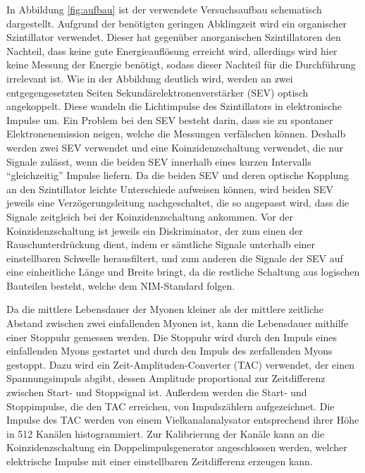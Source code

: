In Abbildung \ref{fig:aufbau} ist der verwendete Versuchsaufbau schematisch dargestellt. Aufgrund der benötigten geringen Abklingzeit wird ein organischer Szintillator
verwendet. Dieser hat gegenüber anorganischen Szintillatoren den Nachteil, dass keine gute Energieauflösung erreicht wird, allerdings wird hier keine Messung der
Energie benötigt, sodass dieser Nachteil für die Durchführung irrelevant ist.
Wie in der Abbildung deutlich wird, werden an zwei entgegengesetzten Seiten Sekundärelektronenverstärker (SEV) optisch angekoppelt. Diese wandeln die Lichtimpulse
des Szintillators in elektronische Impulse um. Ein Problem bei den SEV besteht darin, dass sie zu spontaner Elektronenemission neigen, welche die Messungen
verfälschen können. Deshalb werden zwei SEV verwendet und eine Koinzidenzschaltung verwendet, die nur Signale zulässt, wenn die beiden SEV innerhalb eines kurzen Intervalls \enquote{gleichzeitig}
Impulse liefern. Da die beiden SEV und deren optische Kopplung an den Szintillator leichte Unterschiede aufweisen können, wird beiden SEV jeweils eine Verzögerungsleitung nachgeschaltet, die
so angepasst wird, dass die Signale zeitgleich bei der Koinzidenzschaltung ankommen. Vor der Koinzidenzschaltung ist jeweils ein Diskriminator, der zum einen der Rauschunterdrückung dient,
indem er sämtliche Signale unterhalb einer einstellbaren Schwelle herausfiltert,
und zum anderen die Signale der SEV auf eine einheitliche Länge und Breite bringt, da die restliche Schaltung aus logischen Bauteilen besteht, welche dem NIM-Standard folgen.

Da die mittlere Lebensdauer der Myonen kleiner als der mittlere zeitliche Abstand zwischen zwei einfallenden Myonen ist, kann die Lebensdauer mithilfe einer Stoppuhr gemessen werden.
Die Stoppuhr wird durch den Impuls eines einfallenden Myons gestartet und durch den Impuls des zerfallenden Myons gestoppt. Dazu wird ein Zeit-Amplituden-Converter (TAC) verwendet,
der einen Spannungsimpuls abgibt, dessen Amplitude proportional
zur Zeitdifferenz zwischen Start- und Stoppsignal ist. Außerdem werden die Start- und Stoppimpulse, die den TAC erreichen, von Impulszählern aufgezeichnet. Die Impulse des TAC werden von einem
Vielkanalanalysator entsprechend ihrer Höhe in 512 Kanälen histogrammiert. Zur Kalibrierung der Kanäle kann an die Koinzidenzschaltung ein Doppelimpulsgenerator angeschlossen werden, welcher
elektrische Impulse mit einer einstellbaren Zeitdifferenz erzeugen kann.

